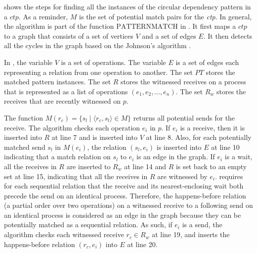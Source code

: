  shows the steps for finding all the instances of the circular dependency pattern in a $\mathit{ctp}$. As a reminder, $M$ is the set of potential match pairs for the \emph{ctp}. In general, the algorithm is part of the function $\mathrm{PATTERNMATCH}$ in . 
It first maps a $\mathit{ctp}$ to a graph that consists of a set of vertices $\mathit{V}$ and a set of edges $\mathit{E}$. 
It then detects all the cycles in the graph based on the Johnson's algorithm \cite{DBLP:journals/siamcomp/Johnson75}.
 
In , the variable $\mathit{V}$ is a set of operations. The variable $\mathit{E}$ is a set of edges each representing a relation from one operation to another. 
The set $\mathit{PT}$ stores the matched pattern instances.
The set $\mathit{R}$ stores the witnessed receives on a process that is represented as a list of operations $(e_1, e_2, \dots, e_n)$. 
The set $\mathit{R_w}$ stores the receives that are recently witnessed on $p$.

The function $\mathit{M}(\mathit{r_c}) = \{\mathit{s_l}\mid\langle\mathit{r_c},\mathit{s_l}\rangle\in\mathit{M}\}$ returns all potential sends for the receive. The algorithm checks each operation $e_i$ in $p$. 
If $\mathit{e_i}$ is a receive, then it is inserted into $\mathit{R}$ at line 7 and is inserted into $\mathit{V}$ at line 8. 
Also, for each potentially matched send $\mathit{s_l}$ in $\mathit{M}(\mathit{e_i})$, the relation $(\mathit{s_l},\mathit{e_i})$ is inserted into $\mathit{E}$ at line 10 indicating that a match relation on $\mathit{s_l}$ to $\mathit{e_i}$ is an edge in the graph. 
If $\mathit{e_i}$ is a wait, all the receives in $\mathit{R}$ are inserted to $\mathit{R_w}$ at line 14 and $\mathit{R}$ is set back to an empty set at line 15, indicating that all the receives in $\mathit{R}$ are witnessed by $\mathit{e_i}$. 
 requires for each sequential relation that the receive and its nearest-enclosing wait both precede the send on an identical process. 
Therefore, the happens-before relation (a partial order over two operations) on a witnessed receive to a following send on an identical process is considered as an edge in the graph because they can be potentially matched as a sequential relation.
As such, if $\mathit{e_i}$ is a send, the algorithm checks each witnessed receive $\mathit{r_c}\in \mathit{R_w}$ at line 19, and inserts the happens-before relation $(\mathit{r_c},\mathit{e_i})$ into $\mathit{E}$ at line 20. 

